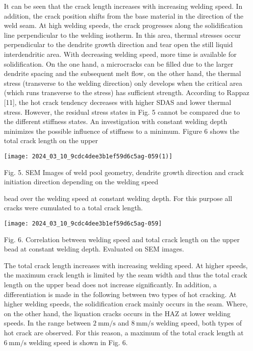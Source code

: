 \documentclass[10pt]{article}
\begin{document}
It can be seen that the crack length increases with increasing welding speed. In addition, the crack position shifts from the base material in the direction of the weld seam. At high welding speeds, the crack progresses along the solidification line perpendicular to the welding isotherm. In this area, thermal stresses occur perpendicular to the dendrite growth direction and tear open the still liquid interdendritic area. With decreasing welding speed, more time is available for solidification. On the one hand, a microcracks can be filled due to the larger dendrite spacing and the subsequent melt flow, on the other hand, the thermal stress (transverse to the welding direction) only develops when the critical area (which runs transverse to the stress) has sufficient strength. According to Rappaz [11], the hot crack tendency decreases with higher SDAS and lower thermal stress. However, the residual stress states in Fig. 5 cannot be compared due to the different stiffness states. An investigation with constant welding depth minimizes the possible influence of stiffness to a minimum. Figure 6 shows the total crack length on the upper

\begin{center}
\texttt{[image: 2024\_03\_10\_9cdc4dee3b1ef59d6c5ag-059(1)]}
\end{center}

Fig. 5. SEM Images of weld pool geometry, dendrite growth direction and crack initiation direction depending on the welding speed

bead over the welding speed at constant welding depth. For this purpose all cracks were cumulated to a total crack length.

\begin{center}
\texttt{[image: 2024\_03\_10\_9cdc4dee3b1ef59d6c5ag-059]}
\end{center}

Fig. 6. Correlation between welding speed and total crack length on the upper bead at constant welding depth. Evaluated on SEM images.

The total crack length increases with increasing welding speed. At higher speeds, the maximum crack length is limited by the seam width and thus the total crack length on the upper bead does not increase significantly. In addition, a differentiation is made in the following between two types of hot cracking. At higher welding speeds, the solidification crack mainly occurs in the seam. Where, on the other hand, the liquation cracks occurs in the HAZ at lower welding speeds. In the range between $2 \mathrm{~mm} / \mathrm{s}$ and $8 \mathrm{~mm} / \mathrm{s}$ welding speed, both types of hot crack are observed. For this reason, a maximum of the total crack length at $6 \mathrm{~mm} / \mathrm{s}$ welding speed is shown in Fig. 6.
\end{document}
